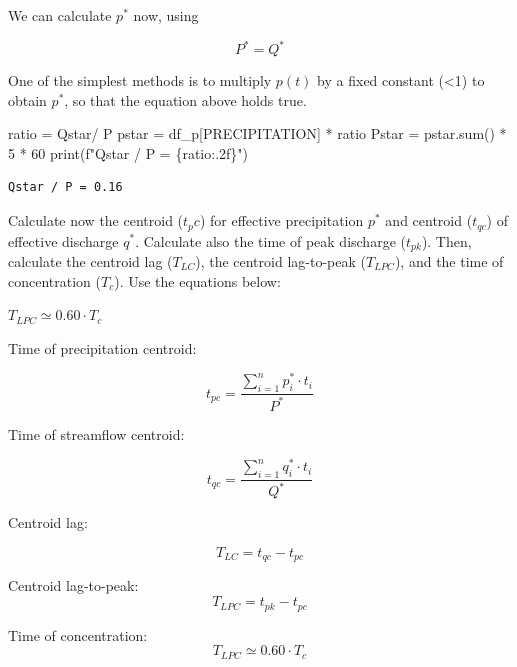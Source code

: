 \documentclass[
  letterpaper,
  DIV=11,
  numbers=noendperiod]{scrreprt}
\newenvironment{Shaded}{\begin{snugshade}}{\end{snugshade}}
\newcommand{\BuiltInTok}[1]{\textcolor[rgb]{0.00,0.23,0.31}{#1}}
\newcommand{\DecValTok}[1]{\textcolor[rgb]{0.68,0.00,0.00}{#1}}
\newcommand{\NormalTok}[1]{\textcolor[rgb]{0.00,0.23,0.31}{#1}}
\newcommand{\OperatorTok}[1]{\textcolor[rgb]{0.37,0.37,0.37}{#1}}
\newcommand{\SpecialCharTok}[1]{\textcolor[rgb]{0.37,0.37,0.37}{#1}}
\newcommand{\SpecialStringTok}[1]{\textcolor[rgb]{0.13,0.47,0.30}{#1}}
\newcommand{\StringTok}[1]{\textcolor[rgb]{0.13,0.47,0.30}{#1}}
\begin{document}
We can calculate \(p^*\) now, using

\[
P^* = Q^*
\]

One of the simplest methods is to multiply \(p(t)\) by a fixed constant
(\textless1) to obtain \(p^*\), so that the equation above holds true.

\begin{Shaded}
\begin{Highlighting}[]
\NormalTok{ratio }\OperatorTok{=}\NormalTok{ Qstar}\OperatorTok{/}\NormalTok{ P}
\NormalTok{pstar }\OperatorTok{=}\NormalTok{ df\_p[}\StringTok{\textquotesingle{}PRECIPITATION\textquotesingle{}}\NormalTok{] }\OperatorTok{*}\NormalTok{ ratio}
\NormalTok{Pstar }\OperatorTok{=}\NormalTok{ pstar.}\BuiltInTok{sum}\NormalTok{() }\OperatorTok{*} \DecValTok{5} \OperatorTok{*} \DecValTok{60}
\BuiltInTok{print}\NormalTok{(}\SpecialStringTok{f"Qstar / P = }\SpecialCharTok{\{}\NormalTok{ratio}\SpecialCharTok{:.2f\}}\SpecialStringTok{"}\NormalTok{)}
\end{Highlighting}
\end{Shaded}

\begin{verbatim}
Qstar / P = 0.16
\end{verbatim}

Calculate now the centroid (\(t_pc\)) for effective precipitation
\(p^*\) and centroid (\(t_{qc}\)) of effective discharge \(q^*\).
Calculate also the time of peak discharge (\(t_{pk}\)). Then, calculate
the centroid lag (\(T_{LC}\)), the centroid lag-to-peak (\(T_{LPC}\)),
and the time of concentration (\(T_c\)). Use the equations below:

\(T_{LPC} \simeq 0.60 \cdot T_c\)

Time of precipitation centroid:

\[
t_{pc} = \frac{\displaystyle \sum_{i=1}^n p_i^* \cdot t_i}{P^*}
\]

Time of streamflow centroid:

\[
t_{qc} = \frac{\displaystyle \sum_{i=1}^n q_i^* \cdot t_i}{Q^*}
\]

Centroid lag:

\[
T_{LC} = t_{qc} - t_{pc}
\]

Centroid lag-to-peak: \[
T_{LPC} = t_{pk} - t_{pc}
\]

Time of concentration: \[
T_{LPC} \simeq 0.60 \cdot T_c
\]
\end{document}
